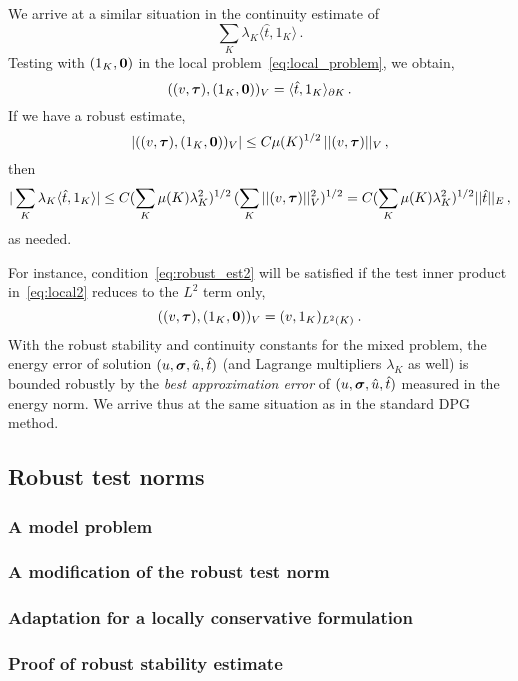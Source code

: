 \documentclass[Proposal.tex]{subfiles}
\begin{document}
We arrive at a similar situation in the continuity estimate of
$$
\sum_K \lambda_K \langle \hat{t}, 1_K \rangle\,.
$$
Testing with $(1_K,{\bf 0})$ in the local problem~\eqref{eq:local_problem}, we obtain,
\begin{equation}
((v,\boldsymbol\tau),(1_K,{\bf 0}))_V = \langle \hat{t}, 1_K \rangle_{\partial K}\,.
\label{eq:local2}
\end{equation}
If we have a robust estimate,
\begin{equation}
| ((v,\boldsymbol\tau),(1_K,{\bf 0}))_V | \leq C \mu(K)^{1/2} \, || (v,\boldsymbol\tau) ||_V\,,
\label{eq:robust_est2}
\end{equation}
then
\begin{equation}
| \sum_K \lambda_K \langle \hat{t}, 1_K \rangle | \leq C (\sum_K \mu(K) \lambda_K^2)^{1/2}
\, (\sum_K || (v,\boldsymbol\tau) ||_V^2)^{1/2}
= C (\sum_K \mu(K) \lambda_K^2)^{1/2}  || \hat{t} ||_E\,,
\end{equation}
as needed.

For instance, condition~\eqref{eq:robust_est2} will be satisfied if the test inner product
in~\eqref{eq:local2} reduces to the $L^2$ term only,
\begin{equation}
((v,\boldsymbol\tau),(1_K,{\bf 0}))_V = (v,1_K)_{L^2(K)} \: .
\end{equation}
With the robust stability and continuity constants for the mixed problem, the energy error
of solution $(u,\boldsymbol\sigma,\hat{u},\hat{t})$ (and Lagrange multipliers $\lambda_K$ as well)
is bounded robustly by the {\em best approximation error} of  $(u,\boldsymbol\sigma,\hat{u},\hat{t})$
measured in the energy norm. We arrive thus at the same situation as in the standard
DPG method.

\subsection{Robust test norms}
\subsubsection{A model problem}
\subsubsection{A modification of the robust test norm}
\subsubsection{Adaptation for a locally conservative formulation}
\subsubsection{Proof of robust stability estimate}
\end{document}
